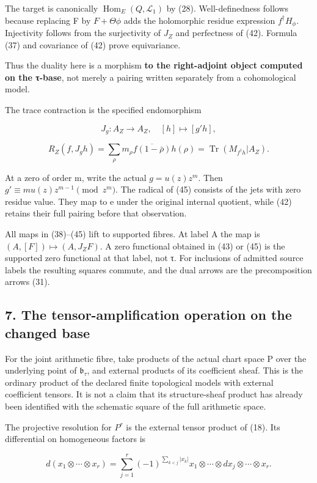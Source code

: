 \documentclass[
]{article}
\begin{document}
The target is canonically \(\operatorname{Hom}_E(Q,\mathcal L_1)\) by
(28). Well-definedness follows because replacing F by \(F+\Theta\phi\)
adds the holomorphic residue expression \(f^\dagger H_\phi\).
Injectivity follows from the surjectivity of \(J_Z\) and perfectness of
(42). Formula (37) and covariance of (42) prove equivariance.

Thus the duality here is a morphism \textbf{to the right-adjoint object
computed on the τ-base}, not merely a pairing written separately from a
cohomological model.

The trace contraction is the specified endomorphism

\[
J_g:A_Z\to A_Z,\quad[h]\mapsto[g'h],
\tag{44}
\]

\[
R_Z(f,J_gh)=\sum_\rho m_\rho\overline{f(1-\bar\rho)}h(\rho)
=\operatorname{Tr}(M_{f^\dagger h}|A_Z).
\tag{45}
\]

At a zero of order m, write the actual \(g=u(z)z^m\). Then
\(g'\equiv m u(z)z^{m-1}\pmod{z^m}\). The radical of (45) consists of
the jets with zero residue value. They map to e under the original
internal quotient, while (42) retains their full pairing before that
observation.

All maps in (38)--(45) lift to supported fibres. At label A the map is
\((A,[F])\mapsto(A,J_ZF)\). A zero functional obtained in (43) or (45)
is the supported zero functional at that label, not τ. For inclusions of
admitted source labels the resulting squares commute, and the dual
arrows are the precomposition arrows (31).

\subsection{7. The tensor-amplification operation on the changed
base}\label{the-tensor-amplification-operation-on-the-changed-base}

For the joint arithmetic fibre, take products of the actual chart space
P over the underlying point of \(\mathfrak b_\tau\), and external
products of its coefficient sheaf. This is the ordinary product of the
declared finite topological models with external coefficient tensors. It
is not a claim that its structure-sheaf product has already been
identified with the schematic square of the full arithmetic space.

The projective resolution for \(P^r\) is the external tensor product of
(18). Its differential on homogeneous factors is

\[
d(x_1\otimes\cdots\otimes x_r)=
\sum_{j=1}^r(-1)^{\sum_{k<j}|x_k|}
 x_1\otimes\cdots\otimes dx_j\otimes\cdots\otimes x_r.
\tag{46}
\]
\end{document}
